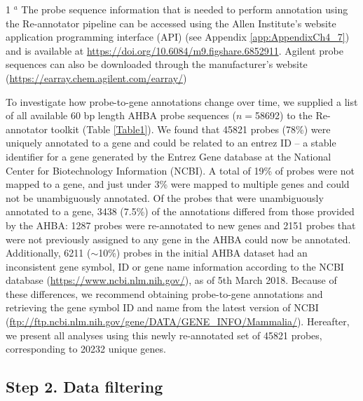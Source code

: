 \begin{table}[h!]
{\begin{tabular}{ll}
\end{tabular}}
\begin{tablenotes}
     \item[1] $^{a}$ The probe sequence information that is needed to perform annotation using the Re-annotator pipeline can be accessed using the Allen Institute’s website application programming interface (API) (see Appendix  \ref{app:AppendixCh4_7}) and is available at \url{https://doi.org/10.6084/m9.figshare.6852911}. Agilent probe sequences can also be downloaded  through the manufacturer's website (\url{https://earray.chem.agilent.com/earray/})
   \end{tablenotes}
\end{table}

To investigate how probe-to-gene annotations change over time, we supplied a list of all available 60 bp length AHBA probe sequences ($n = $\num{58692}) to the Re-annotator toolkit \citep{Arloth2015} (Table \ref{Table1}). We found that \num{45821} probes (78\%) were uniquely annotated to a gene and could be related to an entrez ID -- a stable identifier for a gene generated by the Entrez Gene database at the National Center for Biotechnology Information (NCBI). A total of 19\% of probes were not mapped to a gene, and just under 3\% were mapped to multiple genes and could not be unambiguously annotated. Of the probes that were unambiguously annotated to a gene, \num{3438} (7.5\%) of the annotations differed from those provided by the AHBA: \num{1287} probes were re-annotated to new genes and \num{2151} probes that were not previously assigned to any gene in the AHBA could now be annotated. Additionally, \num{6211} ($\sim$10\%) probes in the initial AHBA dataset had an inconsistent gene symbol, ID or gene name information according to the NCBI database (\url{https://www.ncbi.nlm.nih.gov/}), as of 5th March 2018. Because of these differences, we recommend obtaining probe-to-gene annotations and retrieving the gene symbol ID and name from the latest version of NCBI (\url{ftp://ftp.ncbi.nlm.nih.gov/gene/DATA/GENE_INFO/Mammalia/}). Hereafter, we present all analyses using this newly re-annotated set of \num{45821} probes, corresponding to \num{20232} unique genes.

\subsection{Step 2. Data filtering}

